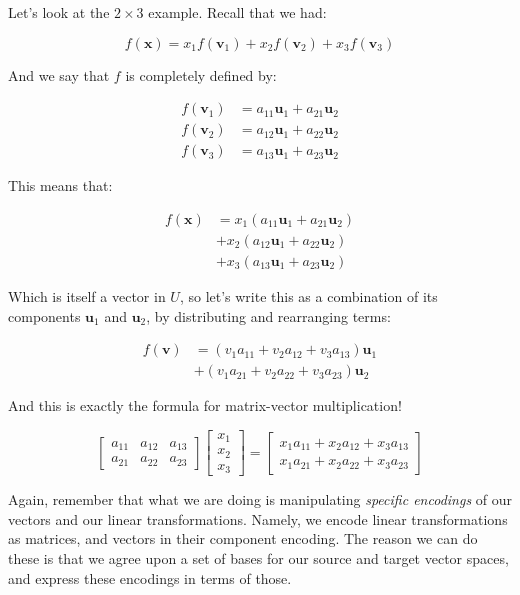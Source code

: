 \documentclass[]{article}
\begin{document}
Let's look at the \(2 \times 3\) example. Recall that we had:

\[
f(\mathbf{x}) = x_1 f(\mathbf{v}_1) + x_2 f(\mathbf{v}_2) + x_3 f(\mathbf{v}_3)
\]

And we say that \(f\) is completely defined by:

\[
\begin{aligned}
f(\mathbf{v}_1) & = a_{11} \mathbf{u}_1 + a_{21} \mathbf{u}_2 \\
f(\mathbf{v}_2) & = a_{12} \mathbf{u}_1 + a_{22} \mathbf{u}_2 \\
f(\mathbf{v}_3) & = a_{13} \mathbf{u}_1 + a_{23} \mathbf{u}_2
\end{aligned}
\]

This means that:

\[
\begin{aligned}
f(\mathbf{x}) & = x_1 (a_{11} \mathbf{u}_1 + a_{21} \mathbf{u}_2) \\
              & + x_2 (a_{12} \mathbf{u}_1 + a_{22} \mathbf{u}_2) \\
              & + x_3 (a_{13} \mathbf{u}_1 + a_{23} \mathbf{u}_2)
\end{aligned}
\]

Which is itself a vector in \(U\), so let's write this as a combination of its
components \(\mathbf{u}_1\) and \(\mathbf{u}_2\), by distributing and
rearranging terms:

\[
\begin{aligned}
f(\mathbf{v}) & = (v_1 a_{11} + v_2 a_{12} + v_3 a_{13}) \mathbf{u}_1 \\
              & + (v_1 a_{21} + v_2 a_{22} + v_3 a_{23}) \mathbf{u}_2
\end{aligned}
\]

And this is exactly the formula for matrix-vector multiplication!

\[
\begin{bmatrix}
a_{11} & a_{12} & a_{13} \\
a_{21} & a_{22} & a_{23}
\end{bmatrix}
\begin{bmatrix}
x_1 \\
x_2 \\
x_3
\end{bmatrix}
=
\begin{bmatrix}
x_1 a_{11} + x_2 a_{12} + x_3 a_{13} \\
x_1 a_{21} + x_2 a_{22} + x_3 a_{23}
\end{bmatrix}
\]

Again, remember that what we are doing is manipulating \emph{specific encodings}
of our vectors and our linear transformations. Namely, we encode linear
transformations as matrices, and vectors in their component encoding. The reason
we can do these is that we agree upon a set of bases for our source and target
vector spaces, and express these encodings in terms of those.
\end{document}
